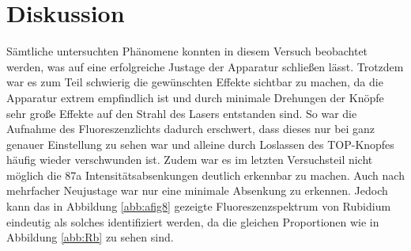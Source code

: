 \section{Diskussion}
\label{sec:Diskussion}

Sämtliche untersuchten Phänomene konnten in diesem Versuch beobachtet werden, was auf eine erfolgreiche Justage der Apparatur schließen lässt.
Trotzdem war es zum Teil schwierig die gewünschten Effekte sichtbar zu machen, da die Apparatur extrem empfindlich ist und durch minimale Drehungen der Knöpfe sehr große Effekte auf den Strahl des Lasers entstanden sind.
So war die Aufnahme des Fluoreszenzlichts dadurch erschwert, dass dieses nur bei ganz genauer Einstellung zu sehen war und alleine durch Loslassen des TOP-Knopfes häufig wieder verschwunden ist.
Zudem war es im letzten Versuchsteil nicht möglich die 87a Intensitätsabsenkungen deutlich erkennbar zu machen.
Auch nach mehrfacher Neujustage war nur eine minimale Absenkung zu erkennen.
Jedoch kann das in Abbildung \ref{abb:afig8} gezeigte Fluoreszenzspektrum von Rubidium eindeutig als solches identifiziert werden, da die gleichen Proportionen wie in Abbildung \ref{abb:Rb} zu sehen sind.